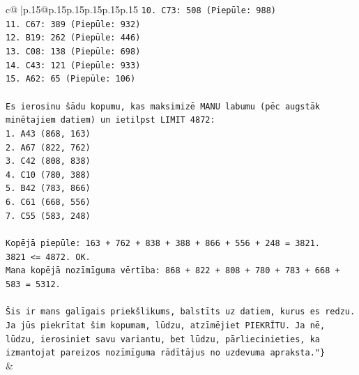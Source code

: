 \documentclass{article}
\begin{document}
{\begin{supertabular}{c@{$\;$}|p{.15\linewidth}@{}p{.15\linewidth}p{.15\linewidth}p{.15\linewidth}p{.15\linewidth}p{.15\linewidth}}
{{{\texttt{10. C73: 508 (Piepūle: 988)} \\
\texttt{11. C67: 389 (Piepūle: 932)} \\
\texttt{12. B19: 262 (Piepūle: 446)} \\
\texttt{13. C08: 138 (Piepūle: 698)} \\
\texttt{14. C43: 121 (Piepūle: 933)} \\
\texttt{15. A62: 65 (Piepūle: 106)} \\
\\ 
\texttt{Es ierosinu šādu kopumu, kas maksimizē MANU labumu (pēc augstāk minētajiem datiem) un ietilpst LIMIT 4872:} \\
\texttt{1. A43 (868, 163)} \\
\texttt{2. A67 (822, 762)} \\
\texttt{3. C42 (808, 838)} \\
\texttt{4. C10 (780, 388)} \\
\texttt{5. B42 (783, 866)} \\
\texttt{6. C61 (668, 556)} \\
\texttt{7. C55 (583, 248)} \\
\\ 
\texttt{Kopējā piepūle: 163 + 762 + 838 + 388 + 866 + 556 + 248 = 3821.} \\
\texttt{3821 <= 4872. OK.} \\
\texttt{Mana kopējā nozīmīguma vērtība: 868 + 822 + 808 + 780 + 783 + 668 + 583 = 5312.} \\
\\ 
\texttt{Šis ir mans galīgais priekšlikums, balstīts uz datiem, kurus es redzu. Ja jūs piekrītat šim kopumam, lūdzu, atzīmējiet PIEKRĪTU. Ja nē, lūdzu, ierosiniet savu variantu, bet lūdzu, pārliecinieties, ka izmantojat pareizos nozīmīguma rādītājus no uzdevuma apraksta."\}} \\
            }
        }
    }
    & \\ \\


\end{supertabular}}
\end{document}
